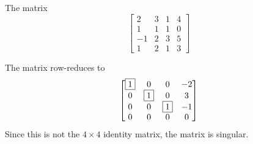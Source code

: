 \documentclass{ximera}
\begin{document}
\begin{exercise}
  The matrix
  \[
    \begin{bmatrix}
      2 & 3 & 1 & 4\\
      1 & 1 & 1 & 0\\
      -1 & 2 & 3 & 5\\
      1 & 2 & 1 & 3
    \end{bmatrix}
  \]
  \begin{multipleChoice}
  \end{multipleChoice}

  \begin{feedback}[correct]
    The matrix row-reduces to
    \[
      \begin{bmatrix}
        \fbox{1} & 0 & 0 & -2\\
        0 & \fbox{1} & 0 & 3\\
        0 & 0 & \fbox{1} & -1\\
        0 & 0 & 0 & 0
      \end{bmatrix}
    \]
    Since this is not the $4\times 4$ identity matrix, the matrix is singular.
  \end{feedback}
\end{exercise}
\end{document}
